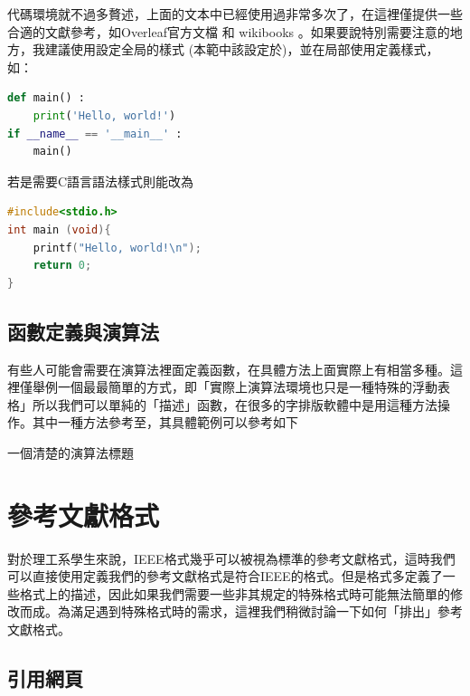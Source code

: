 \documentclass[12pt]{report}
\theoremstyle{plain}
\begin{document}
代碼環境就不過多贅述，上面的文本中已經使用過非常多次了，在這裡僅提供一些合適的文獻參考，如Overleaf官方文檔 \cite{latexlstoverleaf} 和 wikibooks \cite{latexlstwiki}。如果要說特別需要注意的地方，我建議使用設定全局的樣式 (本範中該設定於)，並在局部使用\code{[...]}定義樣式，如：
\begin{lstlisting}[language=Python]
def main() :
    print('Hello, world!')
if __name__ == '__main__' :
    main()
\end{lstlisting}
若是需要C語言語法樣式則能改為\code{[language=C]]}
\begin{lstlisting}[language=C]
#include<stdio.h>
int main (void){
    printf("Hello, world!\n");
    return 0;
}
\end{lstlisting}

\subsection{函數定義與演算法}

有些人可能會需要在演算法裡面定義函數，在具體方法上面實際上有相當多種。這裡僅舉例一個最最簡單的方式，即「實際上演算法環境也只是一種特殊的浮動表格」所以我們可以單純的「描述」函數，在很多的字排版軟體中是用這種方法操作。其中一種方法參考至\cite{latexfunc}，其具體範例可以參考如下

\begin{algorithm}
\caption{一個清楚的演算法標題}
\label{alg:func}
\end{algorithm}

\section{參考文獻格式}

對於理工系學生來說，IEEE格式幾乎可以被視為標準的參考文獻格式，這時我們可以直接使用定義我們的參考文獻格式是符合IEEE的格式。但是格式多定義了一些格式上的描述，因此如果我們需要一些非其規定的特殊格式時可能無法簡單的修改而成。為滿足遇到特殊格式時的需求，這裡我們稍微討論一下如何「排出」參考文獻格式。

\subsection{引用網頁}
\end{document}

